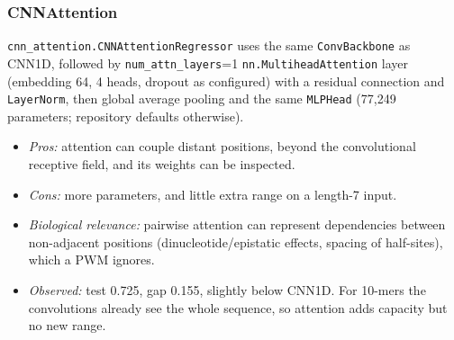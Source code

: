 \subsubsection{CNNAttention}
\texttt{cnn\_attention.CNNAttentionRegressor} uses the same \texttt{ConvBackbone} as CNN1D, followed by \texttt{num\_attn\_layers}=1 \texttt{nn.MultiheadAttention} layer (embedding 64, 4 heads, dropout as configured) with a residual connection and \texttt{LayerNorm}, then global average pooling and the same \texttt{MLPHead} (77{,}249 parameters; repository defaults otherwise).
\begin{itemize}
\item \emph{Pros:} attention can couple distant positions, beyond the convolutional receptive field, and its weights can be inspected.
\item \emph{Cons:} more parameters, and little extra range on a length-7 input.
\item \emph{Biological relevance:} pairwise attention can represent dependencies between non-adjacent positions (dinucleotide/epistatic effects, spacing of half-sites), which a PWM ignores.
\item \emph{Observed:} test 0.725, gap 0.155, slightly below CNN1D. For 10-mers the convolutions already see the whole sequence, so attention adds capacity but no new range.
\end{itemize}

